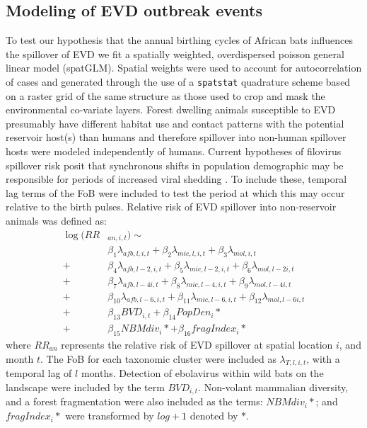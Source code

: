 \documentclass[9pt,twoside,lineno]{pnas-new}
\begin{document}
\subsection*{Modeling of EVD outbreak events}
\label{spatGLM}
To test our hypothesis that the annual birthing cycles of African bats influences the spillover of EVD we fit a spatially weighted, overdispersed poisson general linear model (spatGLM). Spatial weights were used to account for autocorrelation of cases and generated through the use of a \texttt{spatstat} quadrature scheme based on a raster grid of the same structure as those used to crop and mask the environmental co-variate layers. Forest dwelling animals susceptible to EVD presumably have different habitat use and contact patterns with the potential reservoir host(s) than humans and therefore spillover into non-human spillover hosts were modeled independently of humans. Current hypotheses of filovirus spillover risk posit that synchronous shifts in population demographic may be responsible for periods of increased viral shedding \cite{Hayman2015BiannualPopulations, Pourrut2009LargeAegyptiacus.}. To include these, temporal lag terms of the FoB were included to test the period at which this may occur relative to the birth pulses. Relative risk of EVD spillover into non-reservoir animals was defined as:
\[
\begin{split}
    \log(RR& _{an, i, t}) \sim \\
    & \beta_1 \lambda_{afb, l, i, t} + \beta_2 \lambda_{mic, l, i, t} + \beta_3 \lambda_{mol, i, t} \\
 + &\beta_4 \lambda_{afb, l-2, i, t} + \beta_5 \lambda_{mic, l-2, i, t} + \beta_6 \lambda_{mol, l-2 i, t} \\
 + &\beta_7 \lambda_{afb, l-4 i, t} + \beta_8 \lambda_{mic, l-4, i, t} + \beta_9 \lambda_{mol, l-4 i, t} \\
 + &\beta_{10} \lambda_{afb, l-6, i, t} + \beta_{11} \lambda_{mic, l-6, i, t} + \beta_{12} \lambda_{mol, l-6 i, t} \\
 +&\beta_{13} BVD_{i,t} + \beta_{14} PopDen_{i}*  \\
 + &\beta_{15} NBM div_{i}* + \beta_{16} fragIndex_{i}* 
\end{split}
\]
where $RR_{an}$ represents the relative risk of EVD spillover at spatial location $i$, and month $t$. The FoB for each taxonomic cluster were included as $\lambda_{T, l, i, t}$, with a temporal lag of $l$ months. Detection of ebolavirus within wild bats on the landscape were included by the term $BVD_{i,t}$. Non-volant mammalian diversity, and a forest fragmentation were also included as the terms: $NBM div_{i}*$; and $fragIndex_{i}*$ were transformed by $log +1$ denoted by $*$.\par
\end{document}
